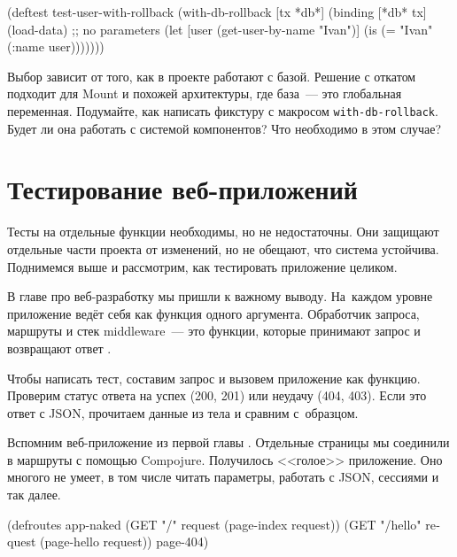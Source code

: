 \else

\begin{english}
  \begin{clojure}
(deftest test-user-with-rollback
  (with-db-rollback [tx *db*]
    (binding [*db* tx]
      (load-data) ;; no parameters
      (let [user (get-user-by-name "Ivan")]
        (is (= "Ivan" (:name user)))))))
  \end{clojure}
\end{english}

\fi

Выбор зависит от того, как в проекте работают с базой. Решение с откатом
подходит для Mount и похожей архитектуры, где база~--- это глобальная
переменная. Подумайте, как написать фикстуру с макросом
\verb|with-db-rollback|. Будет ли она работать с системой компонентов? Что
необходимо в этом случае?

\section{Тестирование веб-приложе\-ний}


Тесты на отдельные функции необходимы, но не недостаточны. Они защищают
отдельные части проекта от изменений, но не обещают, что система
устойчива. Поднимемся выше и рассмотрим, как тестировать приложение целиком.

В главе про веб-разработку мы пришли к важному выводу. На~каждом уровне
приложение ведёт себя как функция одного аргумента. Обработчик запроса, маршруты
и стек middleware~--- это функции, которые принимают запрос и возвращают
ответ .

Чтобы написать тест, составим запрос и вызовем приложение как функцию. Проверим
статус ответа на успех (200, 201) или неудачу (404, 403). Если это ответ с JSON,
прочитаем данные из тела и сравним с~образцом.

Вспомним веб-приложение из первой главы . Отдельные страницы мы
соединили в маршруты с помощью Compojure. Получилось <<голое>> приложение. Оно
многого не умеет, в том числе читать параметры, работать с JSON, сессиями и так
далее.

\pagebreaklarge


\ifnarrow

\begin{english}
  \begin{clojure}
(defroutes app-naked
  (GET "/"
    request (page-index request))
  (GET "/hello"
    request (page-hello request))
  page-404)
  \end{clojure}
\end{english}

